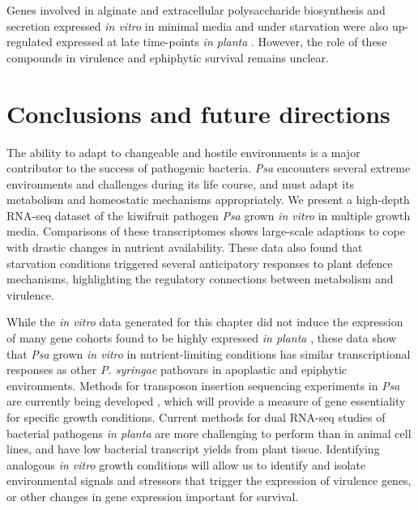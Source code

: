 Genes involved in alginate and extracellular polysaccharide biosynthesis and secretion expressed \textit{in vitro} in minimal media and under starvation were also up-regulated expressed at late time-points \textit{in planta} \citep{McAtee2018-sl}. However, the role of these compounds in virulence and ephiphytic survival remains unclear. 

\section{Conclusions and future directions}

The ability to adapt to changeable and hostile environments is a major contributor to the success of pathogenic bacteria. \textit{Psa} encounters several extreme environments and challenges during its life course, and must adapt its metabolism and homeostatic mechanisms appropriately. We present a high-depth RNA-seq dataset of the kiwifruit pathogen \textit{Psa} grown \textit{in vitro} in multiple growth media. Comparisons of these transcriptomes shows large-scale adaptions to cope with drastic changes in nutrient availability. These data also found that starvation conditions triggered several anticipatory responses to plant defence mechanisms, highlighting the regulatory connections between metabolism and virulence. 

While the \textit{in vitro} data generated for this chapter did not induce the expression of many gene cohorts found to be highly expressed \textit{in planta} \citep{McAtee2018-sl}, these data show that \textit{Psa} grown \textit{in vitro} in nutrient-limiting conditions has similar transcriptional responses as other \textit{P. syringae} pathovars in apoplastic and epiphytic environments. Methods for transposon insertion sequencing experiments in \textit{Psa} are currently being developed \citep{Mesarich2017-ad}, which will provide a measure of gene essentiality for specific growth conditions. Current methods for dual RNA-seq studies of bacterial pathogens \textit{in planta} are more challenging to perform than in animal cell lines, and have low bacterial transcript yields from plant tissue\citep{Nobori2018-uu}. Identifying analogous \textit{in vitro} growth conditions will allow us to identify and isolate environmental signals and stressors that trigger the expression of virulence genes, or other changes in gene expression important for survival.


